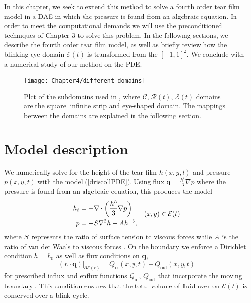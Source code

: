 In this chapter, we seek to extend this method to solve a fourth order tear film model in a DAE in which the pressure  is found from an algebraic equation. In order to meet the computational demands we will use the preconditioned techniques of Chapter 3 to solve this problem. In the following sections, we describe the fourth order tear film model, as well as briefly review how the blinking eye domain $\mathcal{E}(t)$ is transformed from the $[-1,1]^2$. We conclude with a numerical study of our method on the PDE.


\begin{figure}
  \centering
  \texttt{[image: Chapter4/different\_domains]}
  \caption{Plot of the subdomains used in \cite{driscoll2018simulation}, where $\mathcal{C}$, $\mathcal{R}(t)$, $\mathcal{E}(t)$ domains are the square, infinite strip and eye-shaped domain. The mappings between the domains are explained in the following section.}
  \label{driscoll_eye}
\end{figure}
	
\section{Model description}

We numerically solve for the height of the tear film $h(x,y,t)$ and pressure $p(x,y,t)$ with the model (\ref{driscollPDE}). Using flux $\bm{q} =  \frac{h^3}{3} \nabla p$ where the pressure is found from an algebraic equation, this produces the model
\begin{align}
\begin{aligned}
h_t &= - \nabla \cdot \left( \frac{h^3}{3} \nabla p \right), \\
p &= - S \nabla^2 h - A h^{-3},
\end{aligned} \quad (x,y) \in \mathcal{E}(t)
\label{the_pde}
\end{align}
where $S$ represents the ratio of surface tension to viscous forces while $A$ is the ratio of van der Waals to viscous forces \cite{braun2015dynamics}. On the boundary we enforce a Dirichlet condition $h=h_0$ as well as flux conditions on $\bm{q}$,
\begin{equation}
\label{normal_conds}
(n \cdot \bm{q})\vert_{\partial \mathcal{E}(t)} = Q_{\text{in}}(x,y,t)+Q_{\text{out}}(x,y,t)
\end{equation}
for prescribed influx and enflux functions $Q_{\text{in}}$, $Q_{\text{out}}$ that incorporate the moving boundary  \cite{li2015computed,heryudono2007single,braun2015dynamics}.
This condition ensures that the total volume of fluid over on $\mathcal{E}(t)$ is conserved over a blink cycle.

